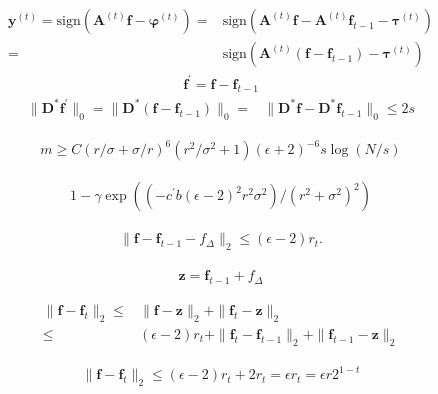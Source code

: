 \begin{frame}[allowframebreaks]
\begin{align}
\bm{y}^{(t)}= \text{sign}\left( \bm{A}^{(t)}\bm{f}- \bm{\varphi}^{(t)}\right) =& \text{sign}\left( \bm{A}^{(t)}\bm{f}- \bm{A}^{(t)}\bm{f}_{t-1}-\bm{\tau}^{(t)}\right) \\
=&\text{sign}\left( \bm{A}^{(t)}\left(\bm{f}-\bm{f}_{t-1}\right)-\bm{\tau}^{(t)}\right)
\end{align}
\begin{align}
\bm{f}^{\prime}=\bm{f}-\bm{f}_{t-1}
\end{align}
\begin{align}
\| \bm{D}^{\ast}\bm{f}^{\prime}\|_{0} = \| \bm{D}^{\ast}\left(\bm{f}-\bm{f}_{t-1}\right)\|_{0} =&  \| \bm{D}^{\ast}\bm{f}-\bm{D}^{\ast}\bm{f}_{t-1}\|_{0}\leq 2s 
\end{align}


\begin{align}
m \geq C(r/\sigma+\sigma/r)^{6}(r^{2}/\sigma^{2}+1)(\epsilon+2)^{-6} s \log(N/s)
\end{align}

\begin{align}
1-\gamma \exp((-c^{\prime} b (\epsilon-2)^{2} r^{2}\sigma^{2})/(r^{2}+\sigma^{2})^{2})
\end{align}

\begin{align}
\| \bm{f}-\bm{f}_{t-1}-f_{\varDelta}\|_{2}\leq (\epsilon-2) r_{t}.
\end{align}

\begin{align}
\bm{z}=\bm{f}_{t-1}+f_{\varDelta}
\end{align}

\begin{align}
\| \bm{f}-\bm{f}_{t}\|_{2} \leq & \| \bm{f}-\bm{z}\|_{2} + \| \bm{f}_{t}-\bm{z}\|_{2}\\
\leq & (\epsilon-2) r_{t} + \| \bm{f}_{t}-\bm{f}_{t-1}\|_{2} + \| \bm{f}_{t-1}-\bm{z}\|_{2}
\end{align}

\begin{block}{}
\begin{align}
\| \bm{f}-\bm{f}_{t}\|_{2} \leq (\epsilon-2) r_{t} +2r_{t}= \epsilon r_{t} = \epsilon r 2^{1-t}
\end{align}
\end{block}


\end{frame}